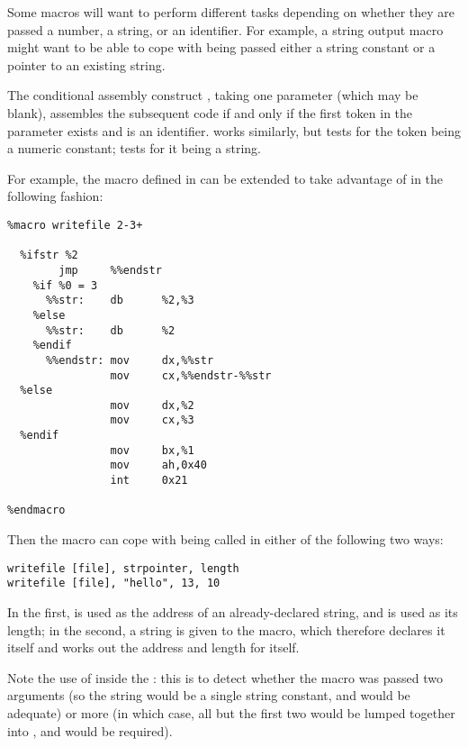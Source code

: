 
Some macros will want to perform different tasks depending on
whether they are passed a number, a string, or an identifier. For
example, a string output macro might want to be able to cope with
being passed either a string constant or a pointer to an existing
string.

The conditional assembly construct , taking one parameter
(which may be blank), assembles the subsequent code if and only if
the first token in the parameter exists and is an identifier.
 works similarly, but tests for the token being a numeric
constant;  tests for it being a string.

For example, the  macro defined in 
can be extended to take advantage of  in the following fashion:

\begin{lstlisting}
%macro writefile 2-3+

  %ifstr %2
        jmp     %%endstr
    %if %0 = 3
      %%str:    db      %2,%3
    %else
      %%str:    db      %2
    %endif
      %%endstr: mov     dx,%%str
                mov     cx,%%endstr-%%str
  %else
                mov     dx,%2
                mov     cx,%3
  %endif
                mov     bx,%1
                mov     ah,0x40
                int     0x21

%endmacro
\end{lstlisting}

Then the  macro can cope with being called in either of
the following two ways:

\begin{lstlisting}
writefile [file], strpointer, length
writefile [file], "hello", 13, 10
\end{lstlisting}

In the first,  is used as the address of an
already-declared string, and  is used as its length; in
the second, a string is given to the macro, which therefore declares
it itself and works out the address and length for itself.

Note the use of  inside the : this is to detect
whether the macro was passed two arguments (so the string would be a
single string constant, and  would be adequate) or more (in
which case, all but the first two would be lumped together into
, and  would be required).

